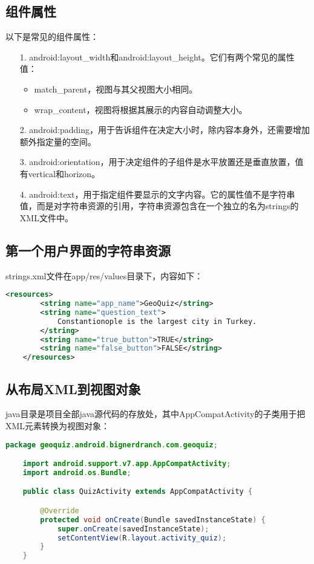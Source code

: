 \documentclass[a4paper,left=2.5cm,right=2.5cm,11pt]{article}
\begin{document}
\subsection{组件属性}
	以下是常见的组件属性：
	\begin{itemize}
		\item[1.] android:layout\_width和android:layout\_height。它们有两个常见的属性值：
		\begin{itemize}
			\item match\_parent，视图与其父视图大小相同。
			\item wrap\_content，视图将根据其展示的内容自动调整大小。
		\end{itemize}

		\item[2.] android:padding，用于告诉组件在决定大小时，除内容本身外，还需要增加额外指定量的空间。

		\item[3.] android:orientation，用于决定组件的子组件是水平放置还是垂直放置，值有vertical和horizon。

		\item[4.] android:text，用于指定组件要显示的文字内容。它的属性值不是字符串值，而是对字符串资源的引用，字符串资源包含在一个独立的名为strings的XML文件中。
	\end{itemize}

\subsection{第一个用户界面的字符串资源}
	strings.xml文件在app/res/values目录下，内容如下：
	\begin{lstlisting}[language=xml]
	<resources>
		<string name="app_name">GeoQuiz</string>
		<string name="question_text">
			Constantionople is the largest city in Turkey.
		</string>
		<string name="true_button">TRUE</string>
		<string name="false_button">FALSE</string>
	</resources>
	\end{lstlisting}

\subsection{从布局XML到视图对象}
	java目录是项目全部java源代码的存放处，其中AppCompatActivity的子类用于把XML元素转换为视图对象：
	\begin{lstlisting}[language = java]
	package geoquiz.android.bignerdranch.com.geoquiz;

	import android.support.v7.app.AppCompatActivity;
	import android.os.Bundle;

	public class QuizActivity extends AppCompatActivity {

		@Override
		protected void onCreate(Bundle savedInstanceState) {
			super.onCreate(savedInstanceState);
			setContentView(R.layout.activity_quiz);
		}
	}
	\end{lstlisting}
\end{document}
